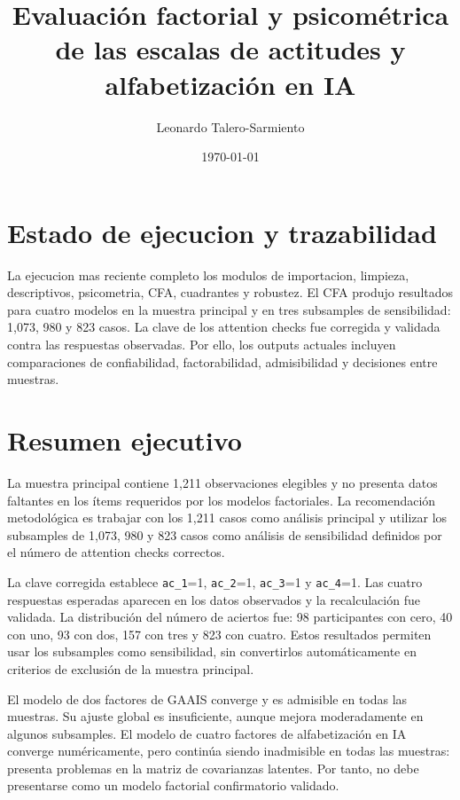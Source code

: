 \documentclass[11pt,a4paper]{article}
\title{Evaluación factorial y psicométrica de las escalas de actitudes y alfabetización en IA}
\author{Leonardo Talero-Sarmiento}
\date{\today}
\begin{document}
\maketitle

\section{Estado de ejecucion y trazabilidad}

La ejecucion mas reciente completo los modulos de importacion, limpieza, descriptivos, psicometria, CFA, cuadrantes y robustez. El CFA produjo resultados para cuatro modelos en la muestra principal y en tres subsamples de sensibilidad: 1,073, 980 y 823 casos. La clave de los attention checks fue corregida y validada contra las respuestas observadas. Por ello, los outputs actuales incluyen comparaciones de confiabilidad, factorabilidad, admisibilidad y decisiones entre muestras.



\section{Resumen ejecutivo}

La muestra principal contiene 1,211 observaciones elegibles y no presenta datos faltantes en los ítems requeridos por los modelos factoriales. La recomendación metodológica es trabajar con los 1,211 casos como análisis principal y utilizar los subsamples de 1,073, 980 y 823 casos como análisis de sensibilidad definidos por el número de attention checks correctos.

La clave corregida establece \texttt{ac\_1}=1, \texttt{ac\_2}=1, \texttt{ac\_3}=1 y \texttt{ac\_4}=1. Las cuatro respuestas esperadas aparecen en los datos observados y la recalculación fue validada. La distribución del número de aciertos fue: 98 participantes con cero, 40 con uno, 93 con dos, 157 con tres y 823 con cuatro. Estos resultados permiten usar los subsamples como sensibilidad, sin convertirlos automáticamente en criterios de exclusión de la muestra principal.

El modelo de dos factores de GAAIS converge y es admisible en todas las muestras. Su ajuste global es insuficiente, aunque mejora moderadamente en algunos subsamples. El modelo de cuatro factores de alfabetización en IA converge numéricamente, pero continúa siendo inadmisible en todas las muestras: presenta problemas en la matriz de covarianzas latentes. Por tanto, no debe presentarse como un modelo factorial confirmatorio validado.
\end{document}
